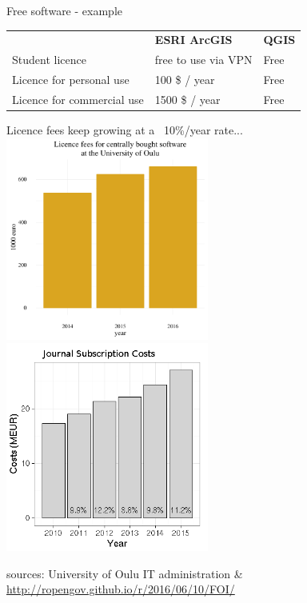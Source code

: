 \documentclass{beamer}
\begin{document}
\begin{frame}{Free software - example}
  \begin{tabularx}{\textwidth}{lXl}
     & \textbf{ESRI ArcGIS} & \textbf{QGIS}\\
    Student licence & free to use via VPN & Free\\
    Licence for personal use & 100 \$ / year & Free\\
    Licence for commercial use & 1500 \$ / year & Free
  \end{tabularx}
\end{frame}

\begin{frame}{Licence fees keep growing at a ~10\%/year rate...}
  \includegraphics[width=0.5\textwidth]{licencefees.pdf}
  \includegraphics[width=0.5\textwidth]{subscriptioncosts.png}

  \tiny{sources: University of Oulu IT administration \& \url{http://ropengov.github.io/r/2016/06/10/FOI/}}
\end{frame}
\end{document}
